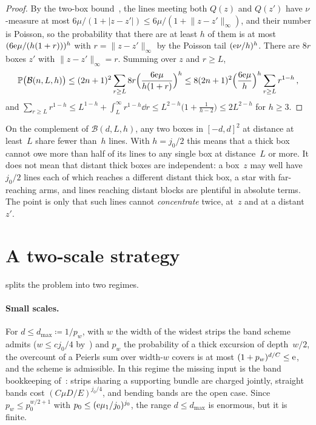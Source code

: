 \documentclass[11pt,letterpaper]{article}
\begin{document}
\begin{proof}
By the two-box bound~\cite[(1.1)]{SC26}, the lines meeting both $Q(z)$ and $Q(z')$ have $\nu$-measure at most $6\mu/(1+\lvert z-z'\rvert)\le6\mu/(1+\lVert z-z'\rVert_\infty)$, and their number is Poisson, so the probability that there are at least $h$ of them is at most $(6\mathrm{e}\mu/(h(1+r)))^h$ with $r=\lVert z-z'\rVert_\infty$ by the Poisson tail $(\mathrm{e}\nu/h)^h$. There are $8r$ boxes $z'$ with $\lVert z-z'\rVert_\infty=r$. Summing over $z$ and $r\ge L$,
\begin{equation*}
  \mathbb P\bigl(\mathcal B(n,L,h)\bigr)\le(2n+1)^2\sum_{r\ge L}8r\Bigl(\frac{6\mathrm{e}\mu}{h(1+r)}\Bigr)^h\le8(2n+1)^2\Bigl(\frac{6\mathrm{e}\mu}{h}\Bigr)^h\sum_{r\ge L}r^{1-h}\,,
\end{equation*}
and $\sum_{r\ge L}r^{1-h}\le L^{1-h}+\int_L^\infty r^{1-h}\dd r\le L^{2-h}\bigl(1+\tfrac{1}{h-2}\bigr)\le2L^{2-h}$ for $h\ge3$.
\end{proof}

On the complement of $\mathcal B(d,L,h)$, any two boxes in $[-d,d]^2$ at distance at least~$L$ share fewer than~$h$ lines. With $h=j_0/2$ this means that a thick box cannot owe more than half of its lines to any single box at distance~$L$ or more. It does not mean that distant thick boxes are independent: a box~$z$ may well have $j_0/2$ lines each of which reaches a different distant thick box, a star with far-reaching arms, and lines reaching distant blocks are plentiful in absolute terms. The point is only that such lines cannot \emph{concentrate} twice, at~$z$ and at a distant~$z'$.

\section{A two-scale strategy}
\label{sec:strategy}

 splits the problem into two regimes.

\paragraph{Small scales.} For $d\le d_{\max}\coloneqq1/p_w$, with $w$ the width of the widest strips the band scheme admits ($w\le cj_0/4$ by~\cite[Section~5]{PS26}) and $p_w$ the probability of a thick excursion of depth~$w/2$, the overcount of a Peierls sum over width-$w$ covers is at most $(1+p_w)^{d/C}\le\mathrm{e}$, and the scheme is admissible. In this regime the missing input is the band bookkeeping of~\cite[Section~5]{PS26}: strips sharing a supporting bundle are charged jointly, straight bands cost $(C\mu D/E)^{j_0/4}$, and bending bands are the open case. Since $p_w\le p_0^{w/2+1}$ with $p_0\le(\mathrm{e}\mu_1/j_0)^{j_0}$, the range $d\le d_{\max}$ is enormous, but it is finite.
\end{document}
